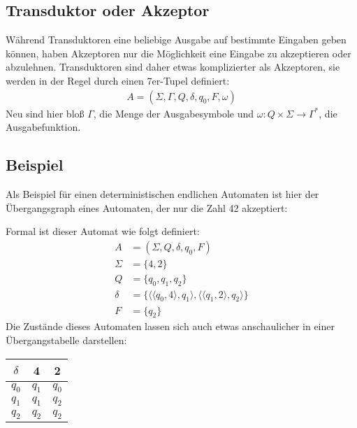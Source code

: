 \subsection{Transduktor oder Akzeptor}
\begin{flushleft}
    Während Transduktoren eine beliebige Ausgabe auf bestimmte Eingaben geben können, haben 
    Akzeptoren nur die Möglichkeit eine Eingabe zu akzeptieren oder abzulehnen.
    Transduktoren sind daher etwas komplizierter als Akzeptoren, sie werden in der Regel durch einen 7er-Tupel definiert:
    \begin{align}
        A=(\Sigma,\Gamma,Q,\delta,q_0,F,\omega)
    \end{align}
    Neu sind hier bloß $\Gamma$, die Menge der Ausgabesymbole und $\omega: Q \times \Sigma \rightarrow \Gamma^*$, die Ausgabefunktion.
\end{flushleft}

\subsection{Beispiel}
\begin{flushleft}
    Als Beispiel für einen deterministischen endlichen Automaten ist hier der Übergangsgraph eines
    Automaten, der nur die Zahl 42 akzeptiert:
    \begin{center}
    \end{center}
    Formal ist dieser Automat wie folgt definiert:
    \begin{align}
        A &= (\Sigma,Q,\delta,q_0,F) \\
        \Sigma &= \{4,2\} \\
        Q &= \{q_0,q_1,q_2\} \\
        \delta &= \{\langle \langle q_0, 4 \rangle, q_1 \rangle, \langle \langle q_1, 2 \rangle, q_2 \rangle \} \\
        F &= \{q_2\}
    \end{align}
    Die Zustände dieses Automaten lassen sich auch etwas anschaulicher in einer Übergangstabelle darstellen:
    \begin{center}
        \begin{tabular}{|c|c|c|}
            \hline
            $\delta$ & 4 & 2 \\
            \hline
            $q_0$ & $q_1$ & $q_0$ \\
            \hline
            $q_1$ & $q_1$ & $q_2$ \\
            \hline
            $q_2$ & $q_2$ & $q_2$ \\
            \hline
        \end{tabular}
    \end{center}
\end{flushleft}

